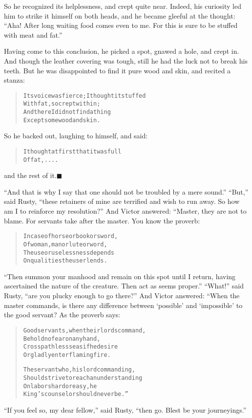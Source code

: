 \documentclass[article, twoside, 14pt]{memoir}
\newcommand{\qed}{\hfill \ensuremath{\blacksquare}}
\renewenvironment{verbatim}{%
\begin{quote}%
\vskip -10pt%
\begin{alltt}\normalfont\large}{\end{alltt}%
\end{quote}%
\vskip -10pt
} %
\begin{document}
So he recognized its helplessness, and crept quite near. Indeed,
his curiosity led him to strike it himself on both heads, and he
became gleeful at the thought:
``Aha! After long waiting food comes even to me. For this is sure to be stuffed with meat and fat.''

Having come to this conclusion, he picked a spot, gnawed a hole,
and crept in. And though the leather covering was tough, still he
had the luck not to break his teeth. But he was disappointed to
find it pure wood and skin, and recited a stanza:

\begin{verbatim}
Its voice was fierce; I thought it stuffed
    With fat, so crept within;
And there I did not find a thing
    Except some wood and skin.
\end{verbatim}
So he backed out, laughing to himself, and said:

\begin{verbatim}
I thought at first that it was full
Of fat, ....
\end{verbatim}
and the rest of it.\hyperref[s3]{\qed}

``And that is why I say that one should not be troubled by a mere sound.''
``But,'' said Rusty,
``these retainers of mine are terrified and wish to run away. So how am I to reinforce my resolution?''
And Victor answered: “Master, they are not to blame. For servants
take after the master. You know the proverb:

\begin{verbatim}
In case of horse or book or sword,
Of woman, man or lute or word,
The use or uselessness depends
On qualities the user lends.
\end{verbatim}
``Then summon your manhood and remain on this spot until I return, having ascertained the nature of the creature. Then act as seems proper.''
``What!'' said Rusty, ``are you plucky enough to go there?'' And
Victor answered: “When the master commands, is there any difference
between `possible' and `impossible' to the good servant? As the
proverb says:

\begin{verbatim}
Good servants, when their lords command,
Behold no fear on any hand,
Cross pathless seas if he desire
Or gladly enter flaming fire.

The servant who, his lord commanding,
Should strive to reach an understanding
On labors hard or easy, he
King's counselor should never be.”
\end{verbatim}
``If you feel so, my dear fellow,'' said Rusty,
``then go. Blest be your journeyings.''
\end{document}
